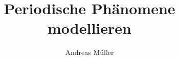 %
%
%
\usepackage[utf8]{inputenc}
\usepackage[T1]{fontenc}
\usepackage{epic}
\usepackage{color}
\usepackage{array}
\usepackage{ifthen}
\usepackage{tikz}
\usepackage{lmodern}
\beamertemplatenavigationsymbolsempty
\title[Fourier]{Periodische Phänomene modellieren}
\author{Andreas Müller}
\date[]{}

